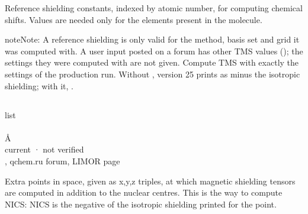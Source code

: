\documentclass[letterpaper,10pt,english,openany,oneside]{sphinxmanual}
\begin{document}
\sphinxAtStartPar
Reference shielding constants, indexed by atomic number, for computing chemical shifts. Values are needed
only for the elements present in the molecule.

\begin{sphinxadmonition}{note}{Note:}
\sphinxAtStartPar
A reference shielding is only valid for the method, basis set and grid it was computed with. A user input
posted on a forum has other TMS values (); the settings they were
computed with are not given. Compute TMS with
exactly the settings of the production run. Without , version 25 prints  as minus the
isotropic shielding; with it, .
\end{sphinxadmonition}

\sphinxAtStartPar
{}

\begin{sphinxVerbatim}[commandchars=\\\{\}]
\end{sphinxVerbatim}


\subsection{}
\label{\detokenize{reference/nmr:points}}\label{\detokenize{reference/nmr:nmr-points}}
\ignorespaces 
\sphinxAtStartPar
{} list\\
 \\
 Å\\
 current · not verified\\
 , qchem.ru forum, LIMOR page

\sphinxAtStartPar
Extra points in space, given as x,y,z triples, at which magnetic shielding tensors are computed in
addition to the nuclear centres. This is the way to compute NICS: NICS is the negative of the isotropic
shielding printed for the point.
\end{document}
